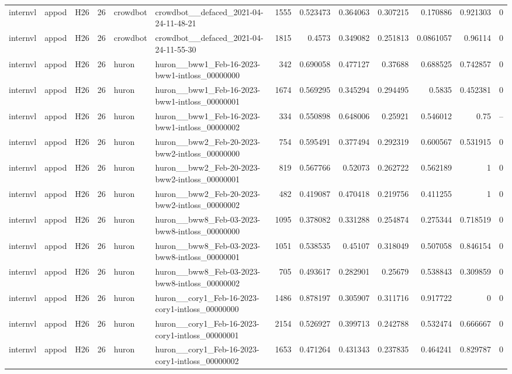 \begin{longtable}{lllrllrrrrrrr}
internvl & appod & H26 & 26 & crowdbot & crowdbot\_\_defaced\_2021-04-24-11-48-21 & 1555 & 0.523473 & 0.364063 & 0.307215 & 0.170886 & 0.921303 & 0 \\
internvl & appod & H26 & 26 & crowdbot & crowdbot\_\_defaced\_2021-04-24-11-55-30 & 1815 & 0.4573 & 0.349082 & 0.251813 & 0.0861057 & 0.96114 & 0 \\
internvl & appod & H26 & 26 & huron & huron\_\_bww1\_Feb-16-2023-bww1-intloss\_00000000 & 342 & 0.690058 & 0.477127 & 0.37688 & 0.688525 & 0.742857 & 0 \\
internvl & appod & H26 & 26 & huron & huron\_\_bww1\_Feb-16-2023-bww1-intloss\_00000001 & 1674 & 0.569295 & 0.345294 & 0.294495 & 0.5835 & 0.452381 & 0 \\
internvl & appod & H26 & 26 & huron & huron\_\_bww1\_Feb-16-2023-bww1-intloss\_00000002 & 334 & 0.550898 & 0.648006 & 0.25921 & 0.546012 & 0.75 & -- \\
internvl & appod & H26 & 26 & huron & huron\_\_bww2\_Feb-20-2023-bww2-intloss\_00000000 & 754 & 0.595491 & 0.377494 & 0.292319 & 0.600567 & 0.531915 & 0 \\
internvl & appod & H26 & 26 & huron & huron\_\_bww2\_Feb-20-2023-bww2-intloss\_00000001 & 819 & 0.567766 & 0.52073 & 0.262722 & 0.562189 & 1 & 0 \\
internvl & appod & H26 & 26 & huron & huron\_\_bww2\_Feb-20-2023-bww2-intloss\_00000002 & 482 & 0.419087 & 0.470418 & 0.219756 & 0.411255 & 1 & 0 \\
internvl & appod & H26 & 26 & huron & huron\_\_bww8\_Feb-03-2023-bww8-intloss\_00000000 & 1095 & 0.378082 & 0.331288 & 0.254874 & 0.275344 & 0.718519 & 0 \\
internvl & appod & H26 & 26 & huron & huron\_\_bww8\_Feb-03-2023-bww8-intloss\_00000001 & 1051 & 0.538535 & 0.45107 & 0.318049 & 0.507058 & 0.846154 & 0 \\
internvl & appod & H26 & 26 & huron & huron\_\_bww8\_Feb-03-2023-bww8-intloss\_00000002 & 705 & 0.493617 & 0.282901 & 0.25679 & 0.538843 & 0.309859 & 0 \\
internvl & appod & H26 & 26 & huron & huron\_\_cory1\_Feb-16-2023-cory1-intloss\_00000000 & 1486 & 0.878197 & 0.305907 & 0.311716 & 0.917722 & 0 & 0 \\
internvl & appod & H26 & 26 & huron & huron\_\_cory1\_Feb-16-2023-cory1-intloss\_00000001 & 2154 & 0.526927 & 0.399713 & 0.242788 & 0.532474 & 0.666667 & 0 \\
internvl & appod & H26 & 26 & huron & huron\_\_cory1\_Feb-16-2023-cory1-intloss\_00000002 & 1653 & 0.471264 & 0.431343 & 0.237835 & 0.464241 & 0.829787 & 0 \\

\end{longtable}
